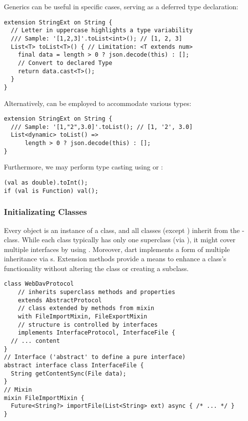 Generics can be useful in specific cases, serving as a deferred type declaration:

\begin{lstlisting}
extension StringExt on String {
  // Letter in uppercase highlights a type variability
  /// Sample: '[1,2,3]'.toList<int>(); // [1, 2, 3] 
  List<T> toList<T>() { // Limitation: <T extends num>
    final data = length > 0 ? json.decode(this) : [];
    // Convert to declared Type
    return data.cast<T>();
  }
}
\end{lstlisting}

\noindent Alternatively,  can be employed to accommodate various types:

\begin{lstlisting}
extension StringExt on String {
  /// Sample: '[1,"2",3.0]'.toList(); // [1, '2', 3.0] 
  List<dynamic> toList() =>
      length > 0 ? json.decode(this) : [];
}
\end{lstlisting}

\noindent Furthermore, we may perform type casting using  or :

\begin{lstlisting}
(val as double).toInt();
if (val is Function) val();
\end{lstlisting}


\subsubsection{Initializating Classes}

Every object is an instance of a class, and all classes (except ) inherit from the -class. While each 
class typically has only one superclass (via ), it might cover multiple interfaces by using .
Moreover, dart implements a form of multiple inheritance via s. Extension methods provide a means to 
enhance a class's functionality without altering the class or creating a subclass.

\begin{lstlisting}
class WebDavProtocol
    // inherits superclass methods and properties
    extends AbstractProtocol 
    // class extended by methods from mixin
    with FileImportMixin, FileExportMixin 
    // structure is controlled by interfaces
    implements InterfaceProtocol, InterfaceFile {
  // ... content
}
// Interface ('abstract' to define a pure interface)
abstract interface class InterfaceFile {
  String getContentSync(File data);
}
// Mixin
mixin FileImportMixin {
  Future<String?> importFile(List<String> ext) async { /* ... */ }
}
\end{lstlisting}
  
